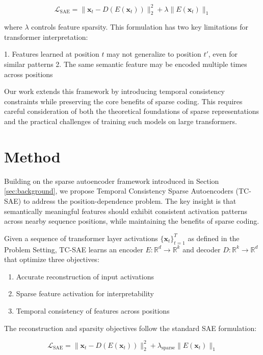 \documentclass{article} %
\begin{document}
\begin{equation}
    \mathcal{L}_{\text{SAE}} = \|\mathbf{x}_t - D(E(\mathbf{x}_t))\|_2^2 + \lambda\|E(\mathbf{x}_t)\|_1
\end{equation}

where $\lambda$ controls feature sparsity. This formulation has two key limitations for transformer interpretation:

1. Features learned at position $t$ may not generalize to position $t'$, even for similar patterns
2. The same semantic feature may be encoded multiple times across positions

Our work extends this framework by introducing temporal consistency constraints while preserving the core benefits of sparse coding. This requires careful consideration of both the theoretical foundations of sparse representations and the practical challenges of training such models on large transformers.

\section{Method}
\label{sec:method}

Building on the sparse autoencoder framework introduced in Section \ref{sec:background}, we propose Temporal Consistency Sparse Autoencoders (TC-SAE) to address the position-dependence problem. The key insight is that semantically meaningful features should exhibit consistent activation patterns across nearby sequence positions, while maintaining the benefits of sparse coding.

Given a sequence of transformer layer activations $\{\mathbf{x}_t\}_{t=1}^T$ as defined in the Problem Setting, TC-SAE learns an encoder $E: \mathbb{R}^d \rightarrow \mathbb{R}^k$ and decoder $D: \mathbb{R}^k \rightarrow \mathbb{R}^d$ that optimize three objectives:

\begin{enumerate}
    \item Accurate reconstruction of input activations
    \item Sparse feature activation for interpretability
    \item Temporal consistency of features across positions
\end{enumerate}

The reconstruction and sparsity objectives follow the standard SAE formulation:

\begin{equation}
    \mathcal{L}_{\text{SAE}} = \|\mathbf{x}_t - D(E(\mathbf{x}_t))\|_2^2 + \lambda_{\text{sparse}}\|E(\mathbf{x}_t)\|_1
\end{equation}
\end{document}
